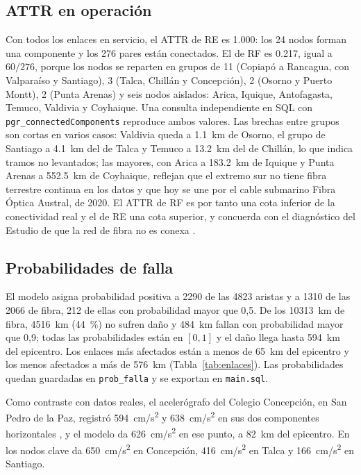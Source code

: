 \documentclass[conference]{IEEEtran}
\begin{document}
\subsection{ATTR en operación}
Con todos los enlaces en servicio, el ATTR de RE es \num{1,000}: los 24 nodos forman una componente y los 276 pares están conectados.
El de RF es \num{0,217}, igual a $60/276$, porque los nodos se reparten en grupos de 11 (Copiapó a Rancagua, con Valparaíso y Santiago), 3 (Talca, Chillán y Concepción), 2 (Osorno y Puerto Montt), 2 (Punta Arenas) y seis nodos aislados: Arica, Iquique, Antofagasta, Temuco, Valdivia y Coyhaique.
Una consulta independiente en SQL con \texttt{pgr\_connectedComponents} reproduce ambos valores.
Las brechas entre grupos son cortas en varios casos: Valdivia queda a \SI{1,1}{km} de Osorno, el grupo de Santiago a \SI{4,1}{km} del de Talca y Temuco a \SI{13,2}{km} del de Chillán, lo que indica tramos no levantados; las mayores, con Arica a \SI{183,2}{km} de Iquique y Punta Arenas a \SI{552,5}{km} de Coyhaique, reflejan que el extremo sur no tiene fibra terrestre continua en los datos y que hoy se une por el cable submarino Fibra Óptica Austral, de 2020.
El ATTR de RF es por tanto una cota inferior de la conectividad real y el de RE una cota superior, y concuerda con el diagnóstico del Estudio de que la red de fibra no es conexa \cite{niclabs2018}.

\subsection{Probabilidades de falla}
El modelo asigna probabilidad positiva a \num{2290} de las \num{4823} aristas y a \num{1310} de las \num{2066} de fibra, \num{212} de ellas con probabilidad mayor que 0,5.
De los \SI{10313}{km} de fibra, \SI{4516}{km} (\SI{44}{\percent}) no sufren daño y \SI{484}{km} fallan con probabilidad mayor que 0,9; todas las probabilidades están en $[0,1]$ y el daño llega hasta \SI{594}{km} del epicentro.
Los enlaces más afectados están a menos de \SI{65}{km} del epicentro y los menos afectados a más de \SI{576}{km} (Tabla~\ref{tab:enlaces}).
Las probabilidades quedan guardadas en \texttt{prob\_falla} y se exportan en \texttt{main.sql}.

Como contraste con datos reales, el acelerógrafo del Colegio Concepción, en San Pedro de la Paz, registró \SI{594}{cm/s^2} y \SI{638}{cm/s^2} en sus dos componentes horizontales \cite{usgsnsmp2010}, y el modelo da \SI{626}{cm/s^2} en ese punto, a \SI{82}{km} del epicentro.
En los nodos clave da \SI{650}{cm/s^2} en Concepción, \SI{416}{cm/s^2} en Talca y \SI{166}{cm/s^2} en Santiago.
\end{document}
